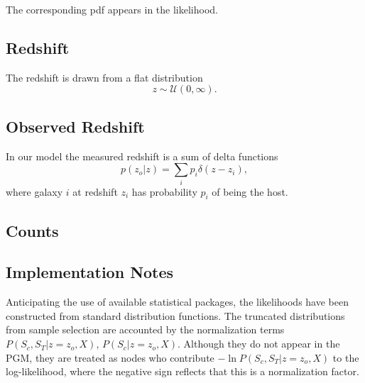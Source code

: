 \documentclass[preprint,3p]{elsarticle}
\begin{document}
The corresponding pdf appears in the likelihood.

\subsection{Redshift}
The redshift is drawn from a flat distribution
\begin{equation}
z\sim \mathcal{U}(0,\infty).
\end{equation}
%

\subsection{Observed Redshift}
In our model the measured redshift is a sum of delta functions
\begin{equation}
p(z_o|z) = \sum_i p_i \delta(z-z_i),
\end{equation}
where galaxy $i$ at
redshift $z_i$ has probability $p_i$ of being
the host.  

\subsection{Counts}

\subsection{Implementation Notes}
Anticipating the use of available statistical packages, the likelihoods have been constructed
from standard distribution functions.  The truncated distributions from sample selection
are accounted by the normalization 
terms $P(S_c, S_T| z=z_o, X)$, $P(S_c| z=z_o, X)$.  Although they do not appear
in the PGM, they are treated as nodes who contribute 
$-\ln{P(S_c, S_T| z=z_o, X)}$ to the log-likelihood, where the negative sign reflects that this is a normalization
factor.
\end{document}
